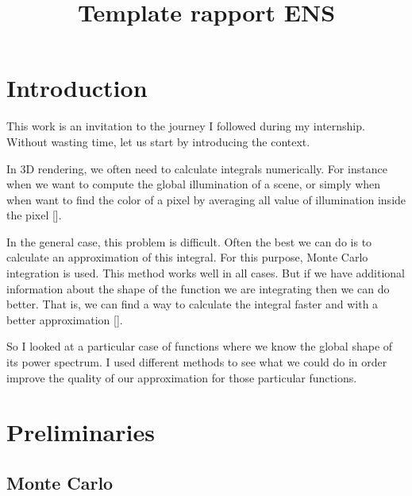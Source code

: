 \documentclass{classeENS}
\title{Template rapport ENS} %
\begin{document}

\matiere{} 
\motif{}


        
\fairemarges %
\tabledematieres %


\section{Introduction}

\> This work is an invitation to the journey I followed during my internship. 
Without wasting time, let us start by introducing the context.

\> In 3D rendering, we often need to calculate integrals numerically. 
For instance when we want to compute the global illumination of a scene,
or simply when when want to find the color of a pixel by averaging all
value of illumination inside the pixel [\cite{DBLP:journals/tog/RamamoorthiAMN12}]. 

\> In the general case, this problem is difficult. Often the best we 
can do is to calculate an approximation of this integral. For this 
purpose, Monte Carlo integration is used. This method works well in 
all cases. But if we have additional information about the shape of 
the function we are integrating then we can do better. That is, we can 
find a way to calculate the integral faster and with a better approximation 
[\cite{singh17convergence}].

\> So I looked at a particular case of functions where we know the global
shape of its power spectrum. I used different methods 
to see what we could do in order improve the quality of our approximation
for those particular functions. 

\section{Preliminaries}

\subsection{Monte Carlo}
\end{document}
